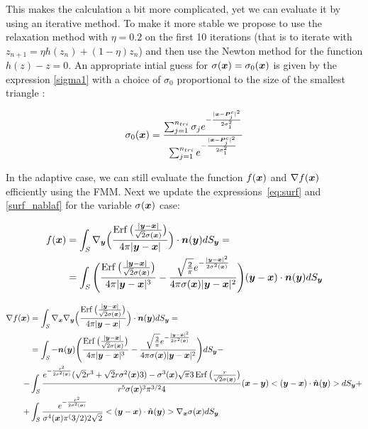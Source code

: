 \documentclass[11pt]{article}
\numberwithin{equation}{section}
\newcommand{\vct}{\vectorsym}
\DeclareMathOperator\erf{Erf}
\newcommand\bx{\vct{x}}
\newcommand\by{\vct{y}}
\newcommand\bn{\boldsymbol n}
\newcommand\bP{\boldsymbol P}
\begin{document}
This makes the calculation a bit more complicated, yet we can evaluate it by using an iterative method. To make it more stable we propose to use the relaxation method with $\eta=0.2$ on the first 10 iterations (that is to iterate with $z_{n+1}=\eta h(z_n)+(1-\eta)z_n$) and then use the Newton method for the function $h(z)-z=0$. An appropriate intial guess for $\sigma(\bx)=\sigma_0(\bx)$ is given by the expression \ref{sigma1} with a choice of $\sigma_0$ proportional to the size of the smallest triangle :
 
\begin{equation}\label{sigma0}
\sigma_0(\bx)=\frac{\sum_{j=1}^{n_{tri}}\sigma_je^{- \frac{|\bx-\bP_j^c|^2}{2\sigma^2_1}}}{\sum_{j=1}^{n_{tri}}e^{-\frac{|\bx-\bP_j^c|^2}{2\sigma^2_1}}}
\end{equation}









In the adaptive case, we can still evaluate the function $f(\bx)$ and
$\nabla f(\bx)$ efficiently using the FMM. Next we update the
expressions~\ref{eq:surf} and \ref{surf_nablaf} for the variable
$\sigma(\bx)$ case:

 
\begin{equation}
\begin{aligned}
f(\bx)&=\int_{\mathit{S}}\nabla_{\by}\Big(\frac{\erf\big(\frac{|\by-\bx|}{\sqrt{2}\sigma(\bx)}\big)}{4\pi|\by-\bx|}\Big)\cdot\bn(\by)dS_{\by}=\\
&=\int_{\mathit{S}}\Bigg(\frac{\erf\big(\frac{|\by-\bx|}{\sqrt{2}\sigma(\bx)}\big)}{4\pi|\by-\bx|^3}-\frac{\sqrt{\frac{2}{\pi}}e^{-\frac{|\by-\bx|^2}{2\sigma^2(\bx)}}}{4\pi\sigma(\bx)|\by-\bx|^2}\Bigg)(\by-\bx)\cdot\bn(\by)dS_{\by}
\end{aligned}
\end{equation}

\begin{equation}
\begin{aligned}
\nabla f(\bx)&=\int_{\mathit{S}}\nabla_{\bx}\nabla_{\by}\Big(\frac{\erf\big(\frac{|\by-\bx|}{\sqrt{2}\sigma(\bx)}\big)}{4\pi|\by-\bx|}\Big)\cdot\bn(\by)dS_{\by}=\\
&=\int_{\mathit{S}}-\bn(\by)\Bigg(\frac{\erf\big(\frac{|\by-\bx|}{\sqrt{2}\sigma(\bx)}\big)}{4\pi|\by-\bx|^3}-\frac{\sqrt{\frac{2}{\pi}}e^{-\frac{|\by-\bx|^2}{2\sigma^2(\bx)}}}{4\pi\sigma(\bx)|\by-\bx|^2}\Bigg)dS_{\by}-\\
-&\int_{\mathit{S}} \frac{e^{-\frac{r^2}{2\sigma^2(\bx)}}(\sqrt{2}r^3+\sqrt{2}r\sigma^2(\bx)3)-\sigma^3(\bx)\sqrt{\pi}3\erf{\big(\frac{r}{\sqrt{2}\sigma(\bx)}}\big)}{r^5\sigma(\bx)^3\pi^{3/2}4}(\bx-\by)<(\by-\bx)\cdot \hat{\bn}(\by)>dS_{\by}+\\
+&\int_{\mathit{S}} \frac{e^{-\frac{r^2}{2\sigma^2(\bx)}}}{\sigma^4(\bx)\pi^(3/2)2\sqrt{2}}<(\by-\bx)\cdot \hat{\bn}(\by)>\nabla_{\bx}\sigma(\bx)dS_{\by}
\end{aligned}
\end{equation}
\end{document}
